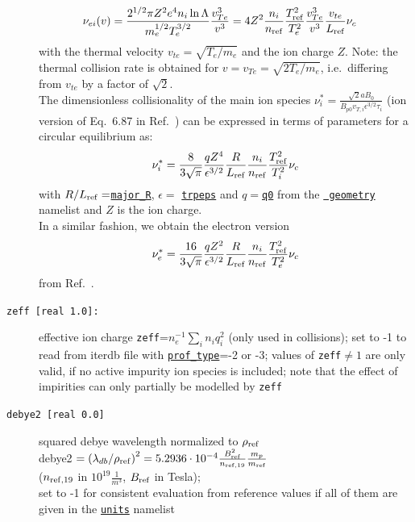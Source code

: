 \documentclass[12pt]{article}
\begin{document}
\begin{description}
\begin{align*}
 \nu_{ei}(v)
 &=\frac{2^{1/2}\pi
 Z^2e^4n_i\ln\Lambda}{m_e^{1/2}T_e^{3/2}}\frac{v_{Te}^3}{v^3}
 =4Z^2\frac{n_i}{n_{{\rm ref}}}\frac{T^2_{{\rm ref}}}{T^2_e}\frac{v_{Te}^3}{v^3}\frac{v_{te}}{L_{{\rm ref}}}\nu_c
\end{align*}
with the thermal velocity $v_{te}=\sqrt{T_e/m_e}$ and the ion charge $Z$. Note: the thermal collision rate is obtained for
$v=v_{Te}=\sqrt{2T_e/m_e}$, i.e.~differing from $v_{te}$ by a factor of $\sqrt{2}$.\\
The dimensionless collisionality of the main ion species $\nu^*_i = \frac{\sqrt{2} a B_0}{B_{p0} v_{T,i} \epsilon^{3/2} \tau_i}$ (ion version of 
Eq.~6.87 in Ref.~\cite{HintonHazeltine1976}) can be expressed in terms of \gene parameters for a circular equilibrium as:
\begin{align*}
\nu^*_i = \frac{8}{3\sqrt{\pi}} \frac{q
Z^4}{\epsilon^{3/2}}\frac{R}{L_{{\rm ref}}}\frac{n_i}{n_{{\rm ref}}}\frac{T_{{\rm ref}}^2}{T^2_i}   \nu_c
\end{align*}
with $R/L_{{\rm ref}} = $\hyperlink{major\_R}{\tt major\_R}, $\epsilon =$
\hyperlink{trpeps}{\tt trpeps} and
$q=$\hyperlink{q0}{\tt q0} from the \hyperlink{geometry_nml}{\tt
geometry} namelist and $Z$ is the ion charge.\\
In a similar fashion, we obtain the electron version
\begin{align*}
\nu^*_e = \frac{16}{3\sqrt{\pi}} \frac{q
Z^2}{\epsilon^{3/2}}\frac{R}{L_{{\rm ref}}}\frac{n_i}{n_{{\rm ref}}}\frac{T_{{\rm ref}}^2}{T^2_e}   \nu_c
\end{align*}
from Ref.~\cite{HintonHazeltine1976}.
\item[\hypertarget{zeff}{\tt zeff [real 1.0]:}] effective ion charge 
\texttt{zeff}=$n_e^{-1}\sum_i n_i q_i^2$ (only used in collisions);
set to -1 to read from iterdb file with \hyperlink{prof_type}{\texttt{prof\_type}}=-2 or -3;
values of \texttt{zeff}$\ne 1$ are only valid, if no active impurity ion
species is included; note that the effect of impirities can only
partially be modelled by {\tt zeff}
\item[\texttt{debye2 [real 0.0]}] squared debye wavelength normalized to $\rho_{\rm ref}$\\
 debye2 $=\left(\lambda_{db}/\rho_{\rm ref}\right)^2=5.2936\cdot 10^{-4}\frac{B_{\rm ref}^2}{n_{{\rm ref} ,19}}\frac{m_p}{m_{\rm ref}}$\\
 ($n_{{\rm ref} ,19}$ in $10^{19}\frac{1}{m^3}$, $B_{\rm ref}$ in Tesla);\\
set to -1 for consistent evaluation from reference values if all of them are given 
in the \hyperlink{units_nml}{\tt units} namelist
\end{description}
\end{document}
